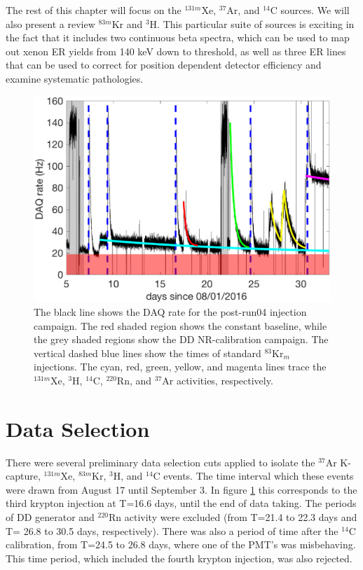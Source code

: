 The rest of this chapter will focus on the $^{131m}$Xe, $^{37}$Ar, and $^{14}$C sources. We will also present a review $^{83m}$Kr and $^{3}$H. This particular suite of sources is exciting in the fact that it includes two continuous beta spectra, which can be used to map out xenon ER yields from 140 keV down to threshold, as well as three ER lines that can be used to correct for position dependent detector efficiency and examine systematic pathologies.
\begin{figure}[h!]
\centering
\includegraphics[width=\textwidth]{Figures/post_Run4_DAQrate.eps}
\caption{The black line shows the DAQ rate for the post-run04 injection campaign. The red shaded region shows the constant baseline, while the grey shaded regions show the DD NR-calibration campaign. The vertical dashed blue lines show the times of standard $^{83}$Kr$_m$ injections. The cyan, red, green, yellow, and magenta lines trace the $^{131m}$Xe, $^{3}$H, $^{14}$C, $^{220}$Rn, and $^{37}$Ar activities, respectively.} 
\label{fig:DAQrate}
\end{figure}

\section{Data Selection}
There were several preliminary data selection cuts applied to isolate the $^{37}$Ar K-capture, $^{131m}$Xe, $^{83m}$Kr, $^{3}$H, and $^{14}$C events. The time interval which these events were drawn from August 17 until September 3. In figure \ref{fig:DAQrate} this corresponds to the third krypton injection at T=16.6 days, until the end of data taking. The periods of DD generator and $^{220}$Rn activity were excluded (from T=21.4 to 22.3 days and T= 26.8 to 30.5 days, respectively). There was also a period of time after the $^{14}$C calibration, from T=24.5 to 26.8 days, where one of the PMT's was misbehaving. This time period, which included the fourth krypton injection, was also rejected.

